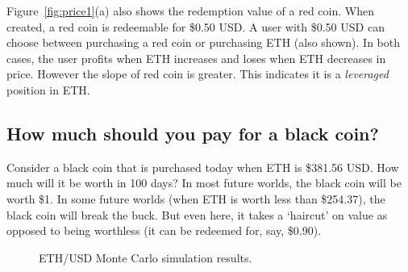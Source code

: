 Figure~\ref{fig:price1}(a) also shows the redemption value of a red coin. When created, a red coin is redeemable for \$0.50 USD. A user with \$0.50 USD can choose between purchasing a red coin or purchasing ETH (also shown). In both cases, the user profits when ETH increases and loses when ETH decreases in price. However the slope of red coin is greater. This indicates it is a \emph{leveraged} position in ETH.  


\subsection{How much should you pay for a black coin?}

Consider a black coin that is purchased today when ETH is \$381.56 USD. How much will it be worth in 100 days? In most future worlds, the black coin will be worth \$1. In some future worlds (when ETH is worth less than \$254.37), the black coin will break the buck. But even here, it takes a `haircut' on value as opposed to being worthless (\eg it can be redeemed for, say, \$0.90). 

\begin{figure}[t]
    \centering
        \qquad
    \caption{ETH/USD Monte Carlo simulation results. \label{fig:sim}}
\end{figure}

